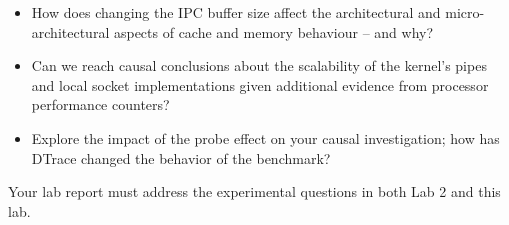 \documentclass[a4paper,10pt]{article}
\begin{document}
\begin{itemize}
  \item How does changing the IPC buffer size affect the architectural and
    micro-architectural aspects of cache and memory behaviour -- and why?
  \item Can we reach causal conclusions about the scalability of the kernel's
    pipes and local socket implementations given additional evidence from
    processor performance counters?
  \item Explore the impact of the probe effect on your causal investigation;
    how has DTrace changed the behavior of the benchmark?
\end{itemize}

\noindent
Your lab report must address the experimental questions in both Lab 2 and this
lab.
\end{document}
